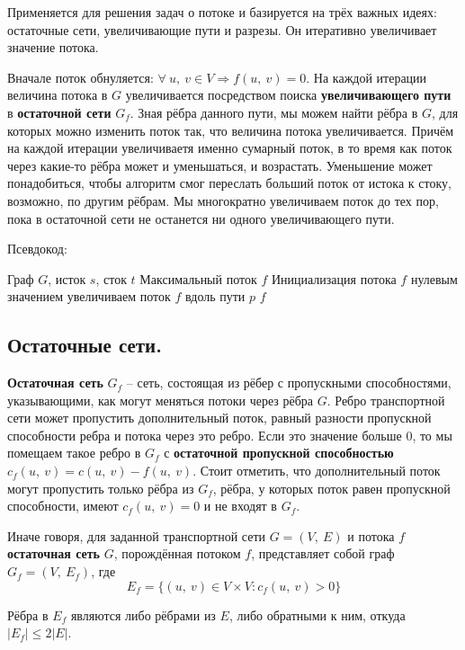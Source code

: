 \documentclass[a4paper,12pt]{article}
\begin{document}
Применяется для решения задач о потоке и базируется на трёх важных идеях: остаточные сети, увеличивающие пути и разрезы. Он итеративно увеличивает значение потока.

Вначале поток обнуляется: $\forall\ u,\ v \in V \Rightarrow f(u,\ v) = 0$. На каждой итерации величина потока в $G$ увеличивается посредством поиска \textbf{увеличивающего пути} в \textbf{остаточной сети} $G_f$. Зная рёбра данного пути, мы можем найти рёбра в $G$, для которых можно изменить поток так, что величина потока увеличивается. Причём на каждой итерации увеличиваетя именно сумарный поток, в то время как поток через какие-то рёбра может и уменьшаться, и возрастать. Уменьшение может понадобиться, чтобы алгоритм смог переслать больший поток от истока к стоку, возможно, по другим рёбрам. Мы многократно увеличиваем поток до тех пор, пока в остаточной сети не останется ни одного увеличивающего пути.

Псевдокод:

\begin{algorithm}
  	\caption{($G,\ s,\ t$)}
	\begin{algorithmic}
	    \Require Граф $G$, исток $s$, сток $t$
	    \Ensure Максимальный поток $f$
	    \State Инициализация потока $f$ нулевым значением
	        \State увеличиваем поток $f$ вдоль пути $p$
	    \EndWhile
	    \State \Return $f$
	\end{algorithmic}
\end{algorithm}

\subsection{Остаточные сети.}

\begin{definition}
    \textbf{Остаточная сеть} $G_f$ -- сеть, состоящая из рёбер с пропускными способностями, указывающими, как могут меняться потоки через рёбра $G$. Ребро транспортной сети может пропустить дополнительный поток, равный разности пропускной способности ребра и потока через это ребро. Если это значение больше 0, то мы помещаем такое ребро в $G_f$ с \textbf{остаточной пропускной способностью} $c_f(u,\ v) = c(u,\ v) - f(u,\ v)$. Стоит отметить, что дополнительный поток могут пропустить только рёбра из $G_f$, рёбра, у которых поток равен пропускной способности, имеют $c_f(u,\ v) = 0$ и не входят в $G_f$.
    
    Иначе говоря, для заданной транспортной сети $G = (V,\ E)$ и потока $f$ \textbf{остаточная сеть} $G$, порождённая потоком $f$, представляет собой граф $G_f = (V,\ E_f)$, где \[E_f = \{(u,\ v) \in V\times V : c_f(u,\ v) > 0\}\]
    
    Рёбра в  $E_f$ являются либо рёбрами из $E$, либо обратными к ним, откуда $|E_f| \leqslant 2|E|$.
\end{definition}
\end{document}
